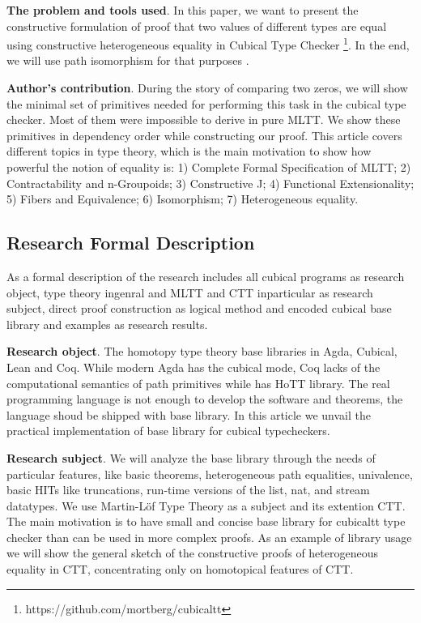 \documentclass{article}
\begin{document}
{\bf The problem and tools used}. In this paper, we want to present the constructive formulation of proof
that two values of different types are equal using constructive heterogeneous equality
in Cubical Type Checker \cite{Mortberg17} \footnote{https://github.com/mortberg/cubicaltt}.
In the end, we will use path isomorphism for that purposes \cite{HoTT}.

{\bf Author's contribution}. During the story of comparing two zeros,
we will show the minimal set of primitives needed
for performing this task in the cubical type checker. Most of
them were impossible to derive in pure MLTT. We show these primitives in dependency order
while constructing our proof. This article covers different topics in type theory,
which is the main motivation to show how powerful the notion of equality is:
1) Complete Formal Specification of MLTT;
2) Contractability and n-Groupoids;
3) Constructive J;
4) Functional Extensionality;
5) Fibers and Equivalence;
6) Isomorphism;
7) Heterogeneous equality.

\subsection{Research Formal Description}

As a formal description of the research includes all cubical programs as research object,
type theory ingenral and MLTT and CTT inparticular as research subject,
direct proof construction as logical method and encoded cubical
base library and examples as research results.

{\bf Research object}. The homotopy type theory base libraries in Agda, Cubical, Lean and Coq.
While modern Agda has the cubical mode, Coq lacks of the computational semantics of path primitives
while has HoTT library. The real programming language is not enough to
develop the software and theorems, the language shoud be shipped with base library. In this article
we unvail the practical implementation of base library for cubical typecheckers.

{\bf Research subject}. We will analyze the base library through the needs of particular features,
like basic theorems, heterogeneous path equalities, univalence, basic HITs like truncations, run-time
versions of the list, nat, and stream datatypes. We use Martin-Löf Type Theory as a subject and
its extention CTT. The main motivation is to have small and concise base library for cubicaltt
type checker than can be used in more complex proofs. As an example of library usage we will show
the general sketch of the constructive proofs of heterogeneous equality in CTT, concentrating only
on homotopical features of CTT.
\end{document}
